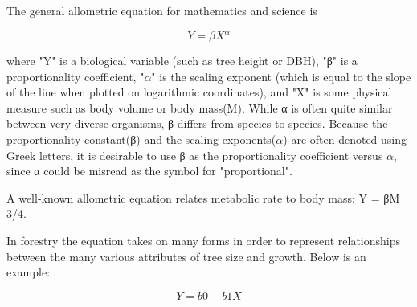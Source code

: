 The general allometric equation for mathematics and science is

\[Y = \beta X^{\alpha}\]

where "Y" is a biological variable (such as tree height or DBH), "β" is a proportionality coefficient, "${\alpha}$" is the scaling exponent (which is equal to the slope of the line when plotted on logarithmic coordinates), and "X" is some physical measure such as body volume or body mass(M). While α is often quite similar between very diverse organisms, β differs from species to species. Because the proportionality constant(β) and the scaling exponents(${\alpha}$) are often denoted using Greek letters, it is desirable to use β as the proportionality coefficient versus ${\alpha}$, since α could be misread as the symbol for "proportional".

A well-known allometric equation relates metabolic rate to body mass: Y = βM 3/4.

In forestry the equation takes on many forms in order to represent relationships between the many various attributes of tree size and growth. Below is an example:

\[Y = b0 + b1 X \]

